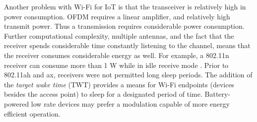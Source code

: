 Another problem with Wi-Fi for IoT is that the transceiver is relatively high in power consumption.  OFDM requires a linear amplifier, and relatively high transmit power.  Thus a transmission requires considerable power consumption.  Further computational complexity, multiple antennas, and the fact that the receiver spends considerable time constantly listening to the channel, means that the receiver consumes considerable energy as well.  For example, a 802.11n receiver can consume more than 1 W while in idle receive mode \cite{halperin2010demystifying}.   Prior to 802.11ah and ax, receivers were not permitted long sleep periods.  The addition of the \emph{target wake time} (TWT) provides a means for Wi-Fi endpoints (devices besides the access point) to sleep for a designated period of time.   Battery-powered low rate devices may prefer a modulation capable of more energy efficient operation.  


